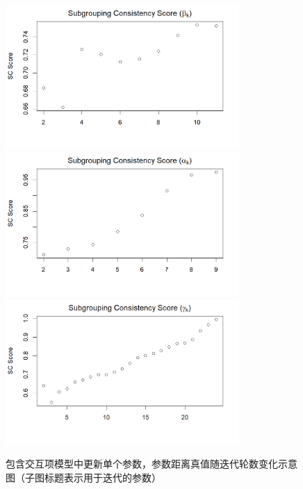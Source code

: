 \documentclass[12pt, a4paper, oneside]{article}
\numberwithin{equation}{section}
\begin{document}
\begin{figure}
{\begin{minipage}[t]{0.5\linewidth}
			\centering
			\includegraphics[width=3.5in]{img/split_only_beta_sc.png}\\
			\vspace{0.02cm}
			\includegraphics[width=3.5in]{img/split_only_alpha_sc.png}\\
			\vspace{0.02cm}
			\includegraphics[width=3.5in]{img/split_only_gamma_sc.png}\\
		\end{minipage}%
	}%
	\centering
	\caption{包含交互项模型中更新单个参数，参数距离真值随迭代轮数变化示意图（子图标题表示用于迭代的参数）}
	\vspace{-0.2cm}
	\label{fig:split1}
\end{figure}
\end{document}

